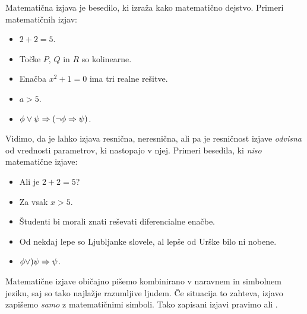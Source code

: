 Matematična izjava je besedilo, ki izraža kako matematično dejstvo. Primeri matematičnih izjav:
%
\begin{itemize}
\item $2 + 2 = 5$.
\item Točke $P$, $Q$ in $R$ so kolinearne.
\item Enačba $x^2 + 1 = 0$ ima tri realne rešitve.
\item $a > 5$.
\item $\phi \lor \psi \Rightarrow (\lnot \phi \Rightarrow \psi)$.
\end{itemize}
%
Vidimo, da je lahko izjava resnična, neresnična, ali pa je resničnost
izjave \emph{odvisna} od vrednosti parametrov, ki nastopajo v njej.
Primeri besedila, ki \emph{niso} matematične izjave:
%
\begin{itemize}
\item Ali je $2 + 2 = 5$?
\item Za vsak $x > 5$.
\item Študenti bi morali znati reševati diferencialne enačbe.
\item Od nekdaj lepe so Ljubljanke slovele, al lepše od Urške bilo ni nobene.
\item $\phi \lor ) \psi \Rightarrow \psi$.
\end{itemize}
%
Matematične izjave običajno pišemo kombinirano v naravnem in simbolnem jeziku,
saj so tako najlažje razumljive ljudem.
%
Če situacija to zahteva, izjavo zapišemo \emph{samo} z matematičnimi simboli.
Tako zapisani izjavi pravimo  ali .


